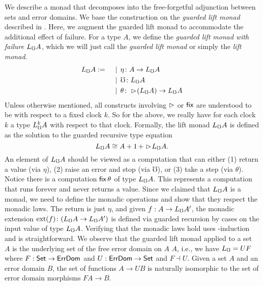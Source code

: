 We describe a monad that decomposes into the free-forgetful adjunction
between sets and error domains. We base the construction on the \emph{guarded
lift monad} described in \cite{mogelberg-paviotti2016}. Here, we augment the
guarded lift monad to accommodate the additional effect of failure. For a type
$A$, we define the \emph{guarded lift monad with failure} $L_\mho A$, which we will
just call the \emph{guarded lift monad} or simply the \emph{lift monad}.
%
\begin{align*}
  L_\mho A :=\quad
  &\mathrel{\bf \,\mid\,} \eta \colon A \to L_\mho A \\
  &\mathrel{\bf \,\mid\,} \mho \colon L_\mho A \\
  &\mathrel{\bf \,\mid\,} \theta \colon \vartriangleright \hspace{-0.2em} (L_\mho A) \to L_\mho A
\end{align*}
%
Unless otherwise mentioned, all constructs involving $\vartriangleright$ or $\mathsf{fix}$ are
understood to be with respect to a fixed clock $k$. So for the above, we really
have for each clock $k$ a type $L_\mho^k A$ with respect to that clock.
%
Formally, the lift monad $L_\mho A$ is defined as the solution to the guarded
recursive type equation
%
\[ L_\mho A \cong A + 1\, + \vartriangleright \hspace{-0.2em} L_\mho A. \]
%
An element of $L_\mho A$ should be viewed as a computation that can either (1)
return a value (via $\eta$), (2) raise an error and stop (via $\mho$), or (3)
take a step (via $\theta$).
%
Notice there is a computation $\mathsf{fix}\, \theta$ of type $L_\mho A$. This represents a
computation that runs forever and never returns a value.
%
Since we claimed that $L_\mho A$ is a monad, we need to define the monadic
operations and show that they respect the monadic laws. The return is just
$\eta$, and given $f : A \to L_\mho A'$, the monadic extension $\text{ext}(f)
\colon (L_\mho A \to L_\mho A')$ is defined via guarded recursion by cases on the
input value of type $L_\mho A$.
%
%
Verifying that the monadic laws hold uses \lob-induction and is straightforward.
%
We observe that the guarded lift monad applied to a set $A$ is the underlying
set of the free error domain on $A$ $A$, i.e., we have $L_\mho = UF$ where $F :
\mathsf{Set} \to \textsf{ErrDom}$ and $U : \textsf{ErrDom} \to \mathsf{Set}$ and $F \dashv U$. Given a set $A$
and an error domain $B$, the set of functions $A \to UB$ is naturally isomorphic
to the set of error domain morphisms $FA \to B$.




